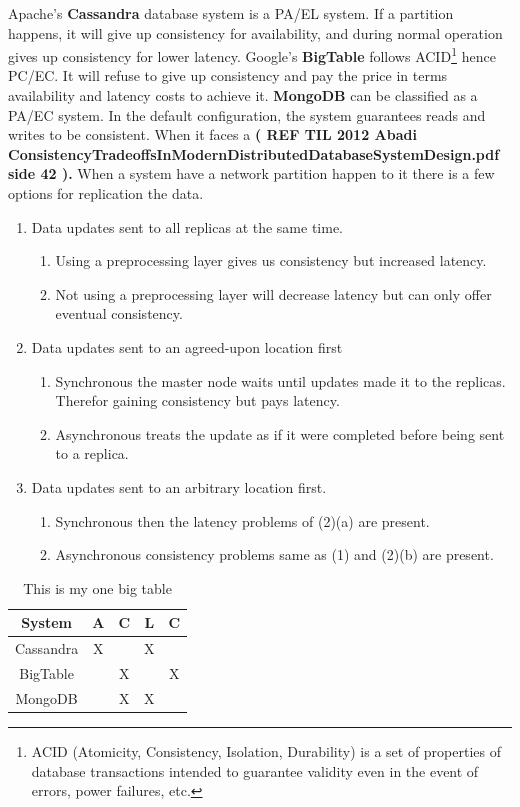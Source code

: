 \noindent Apache's \textbf{Cassandra} database system is a PA/EL system. If a partition happens, it will give up consistency for availability, and during normal operation gives up consistency for lower latency. Google's \textbf{BigTable}
follows ACID\footnote{ACID (Atomicity, Consistency, Isolation, Durability) is a set of properties of database transactions intended to guarantee validity even in the event of errors, power failures, etc.} hence PC/EC. It will refuse to give up consistency and pay the price in terms availability and latency costs to achieve it. \textbf{MongoDB} can be classified as a PA/EC system. In the default configuration, the system guarantees reads and writes to be consistent. When it faces a  \textbf{( REF TIL 2012 Abadi ConsistencyTradeoffsInModernDistributedDatabaseSystemDesign.pdf side 42 ).}
When a system have a network partition happen to it there is a few options for replication the data.
\begin{enumerate}
	
	\item Data updates sent to all replicas at the same time.
	\begin{enumerate}
		\item Using a preprocessing layer gives us consistency but increased latency.
		\item Not using a preprocessing layer will decrease latency but can only offer eventual consistency.
	\end{enumerate}
	\item Data updates sent to an agreed-upon location first
	\begin{enumerate}
		\item Synchronous the master node waits until updates made it to the replicas. Therefor gaining consistency but pays latency.
		\item Asynchronous treats the update as if it were completed before being sent to a replica.
	\end{enumerate}
	\item Data updates sent to an arbitrary location first.
		\begin{enumerate}
		\item Synchronous then the latency problems of (2)(a) are present.
		\item Asynchronous consistency problems same as (1) and (2)(b) are present.
	\end{enumerate}
\end{enumerate}

\begin{table}[H]
	\centering
\begin{tabular}{|c|c|c|c|c|}
	\hline 
	System & A & C & L & C \\ 
	\hline 
	Cassandra & X &  & X &  \\ 
	\hline 
	BigTable &  & X &  & X \\ 
	\hline 
	MongoDB &  & X & X &  \\ 
	\hline 
\end{tabular}
  \caption{This is my one big table} \label{tab:PACELC}
\end{table}